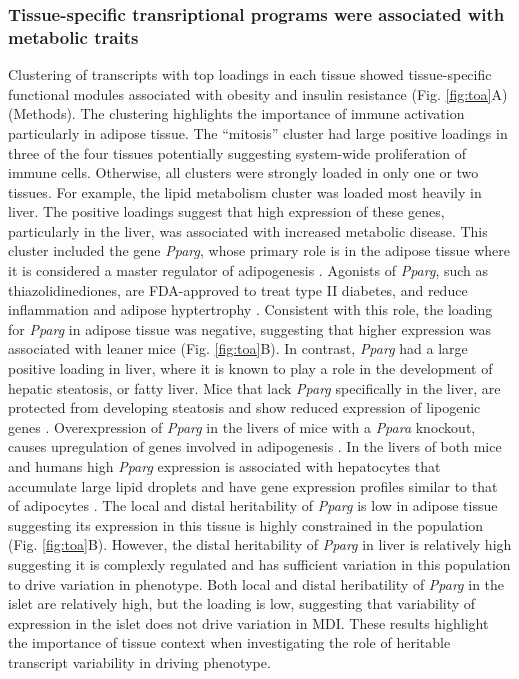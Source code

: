 \documentclass[
]{article}
\providecommand{\DIFdelbegin}{} %
\newcommand{\DIFscaledelfig}{0.5}
\newlength{\DIFdelgraphicswidth} %
\newlength{\DIFdelgraphicsheight} %
\newcommand{\DIFdelincludegraphics}[2][]{%
\sbox{\DIFdelgraphicsbox}{\DIFOincludegraphics[#1]{#2}}%
\settoboxwidth{\DIFdelgraphicswidth}{\DIFdelgraphicsbox} %
\settoboxtotalheight{\DIFdelgraphicsheight}{\DIFdelgraphicsbox} %
\scalebox{\DIFscaledelfig}{%
\parbox[b]{\DIFdelgraphicswidth}{\usebox{\DIFdelgraphicsbox}\\[-\baselineskip] \rule{\DIFdelgraphicswidth}{0em}}\llap{\resizebox{\DIFdelgraphicswidth}{\DIFdelgraphicsheight}{%
\setlength{\unitlength}{\DIFdelgraphicswidth}%
\begin{picture}(1,1)%
\thicklines\linethickness{2pt} %
{\color[rgb]{1,0,0}\put(0,0){\framebox(1,1){}}}%
{\color[rgb]{1,0,0}\put(0,0){\line( 1,1){1}}}%
{\color[rgb]{1,0,0}\put(0,1){\line(1,-1){1}}}%
\end{picture}%
}\hspace*{3pt}}} %
} %
\DeclareRobustCommand{\DIFdelbegin}{\DIFOdelbegin \let\includegraphics\DIFdelincludegraphics} %
\begin{document}
\subsubsection{Tissue-specific transriptional programs were associated
with metabolic
traits}\label{tissue-specific-transriptional-programs-were-associated-with-metabolic-traits}

Clustering of transcripts with top loadings in each tissue showed
tissue-specific functional modules associated with obesity and insulin
resistance (Fig. \ref{fig:toa}A) (Methods). The clustering highlights
the importance of immune activation particularly in adipose tissue. The
``mitosis'' cluster had large positive loadings in three of the four
tissues potentially suggesting system-wide proliferation of immune
cells. Otherwise, all clusters were strongly loaded in only one or two
tissues. For example, the lipid metabolism cluster was loaded most
heavily in liver. The positive loadings suggest that high expression of
these genes, particularly in the liver, was associated with increased
metabolic disease. This cluster included the gene \textit{Pparg}, whose
primary role is in the adipose tissue where it is considered a master
regulator of adipogenesis \cite{pmid17389767}. Agonists of
\textit{Pparg}, such as thiazolidinediones, are FDA-approved to treat
type II diabetes, and reduce inflammation and adipose hyptertrophy
\cite{pmid17389767}. Consistent with this role, the loading for
\textit{Pparg} in adipose tissue was negative, suggesting that higher
expression was associated with leaner mice (Fig. \ref{fig:toa}B). In
contrast, \textit{Pparg} had a large positive loading in liver, where it
is known to play a role in the development of hepatic steatosis, or
fatty liver. Mice that lack \textit{Pparg} specifically in the liver,
are protected from developing steatosis and show reduced expression of
lipogenic genes \cite{pmid12805374, pmid12618528}. Overexpression of
\textit{Pparg} in the livers of mice with a \textit{Ppara} knockout,
causes upregulation of genes involved in adipogenesis
\cite{pmid16357043}. In the livers of both mice and humans high
\textit{Pparg} expression is associated with hepatocytes that accumulate
large lipid droplets and have gene expression profiles similar to that
of adipocytes \cite{pmid15644454, pmid16403437}. The local and distal
heritability of \textit{Pparg} is low in adipose tissue suggesting its
expression in this tissue is highly constrained in the population (Fig.
\ref{fig:toa}B). However, the distal heritability of \textit{Pparg} in
liver is relatively high suggesting it is complexly regulated and has
sufficient variation in this population to drive variation in phenotype.
Both local and distal heribatility of \textit{Pparg} in the islet are
relatively high, but the loading is low, suggesting that variability of
expression in the islet does not drive variation in MDI. These results
highlight the importance of tissue context when investigating the role
of heritable transcript variability in driving phenotype. \DIFdelbegin %
\end{document}
